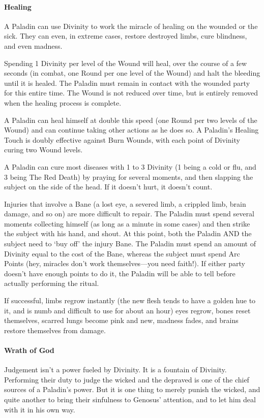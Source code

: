 \documentclass[oneside,11pt,english]{book}
\begin{document}
\paragraph{Healing}
A Paladin can use Divinity to work the miracle of healing on the wounded or the sick. They can 
even, in extreme cases, restore destroyed limbs, cure blindness, and even madness.


Spending 1 Divinity per level of the Wound will heal, over the course of a few seconds (in 
combat, one Round per one level of the Wound) and halt the bleeding until it is healed. The 
Paladin must remain in contact with the wounded party for this entire time. The Wound is not 
reduced over time, but is entirely removed when the healing process is complete. 


A Paladin can heal himself at double this speed (one Round per two levels of the Wound) and can 
continue taking other actions as he does so. A Paladin's Healing Touch is doubly effective against 
Burn Wounds, with each point of Divinity curing two Wound levels. 


A Paladin can cure most diseases with 1 to 3 Divinity (1 being a cold or flu, and 3 being The Red 
Death) by praying for several moments, and then slapping the subject on the side of the head. If it 
doesn't hurt, it doesn't count. 


Injuries that involve a Bane (a lost eye, a severed limb, a crippled limb, brain damage, and so on) 
are more difficult to repair. The Paladin must spend several moments collecting himself (as long 
as a minute in some cases) and then strike the subject with his hand, and shout. At this point, both 
the Paladin AND the subject need to ‘buy off’ the injury Bane. The Paladin must spend an 
amount of Divinity equal to the cost of the Bane, whereas the subject must spend Arc Points (hey, 
miracles don't work themselves—you need faith!). If either party doesn't have enough points to 
do it, the Paladin will be able to tell before actually performing the ritual. 


If successful, limbs regrow instantly (the new flesh tends to have a golden hue to it, and is numb 
and difficult to use for about an hour) eyes regrow, bones reset themselves, scarred lungs become 
pink and new, madness fades, and brains restore themselves from damage.
\paragraph{Wrath of God}
Judgement isn't a power fueled by Divinity. It is a fountain of Divinity. Performing their duty to 
judge the wicked and the depraved is one of the chief sources of a Paladin's power. But it is one 
thing to merely punish the wicked, and quite another to bring their sinfulness to Genosus’ 
attention, and to let him deal with it in his own way. 
\end{document}
